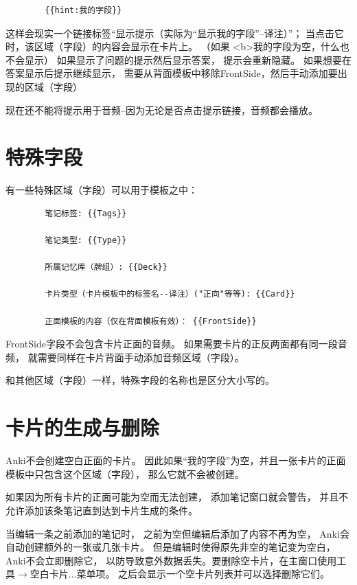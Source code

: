 \documentclass[a4paper]{book}
\begin{document}
	\begin{shaded}\begin{verbatim}
		{{hint:我的字段}}
		\end{verbatim}\end{shaded}
	这样会现实一个链接标签“显示提示（实际为“显示我的字段”--译注）”； 当点击它时，该区域（字段）的内容会显示在卡片上。 （如果
	<b>我的字段为空，什么也不会显示）
	如果显示了问题的提示然后显示答案， 提示会重新隐藏。 如果想要在答案显示后提示继续显示， 需要从背面模板中移除{{FrontSide}}，然后手动添加要出现的区域（字段）
	
	\begin{shaded}
		现在还不能将提示用于音频--因为无论是否点击提示链接，音频都会播放。
	\end{shaded}
	
	\section{特殊字段}\label{specialfields}
	有一些特殊区域（字段）可以用于模板之中：
	\begin{shaded}\begin{verbatim}
		笔记标签: {{Tags}}
		
		笔记类型: {{Type}}
		
		所属记忆库（牌组）: {{Deck}}
		
		卡片类型（卡片模板中的标签名--译注）("正向"等等): {{Card}}
		
		正面模板的内容（仅在背面模板有效）： {{FrontSide}}
		\end{verbatim}\end{shaded}
	FrontSide字段不会包含卡片正面的音频。 如果需要卡片的正反两面都有同一段音频， 就需要同样在卡片背面手动添加音频区域（字段）。
	
	和其他区域（字段）一样，特殊字段的名称也是区分大小写的。
	\section{卡片的生成与删除}
	Anki不会创建空白正面的卡片。 因此如果“我的字段”为空，并且一张卡片的正面模板中只包含这个区域（字段）， 那么它就不会被创建。
	
	如果因为所有卡片的正面可能为空而无法创建， 添加笔记窗口就会警告， 并且不允许添加该条笔记直到达到卡片生成的条件。
	
	当编辑一条之前添加的笔记时， 之前为空但编辑后添加了内容不再为空， Anki会自动创建额外的一张或几张卡片。 但是编辑时使得原先非空的笔记变为空白，Anki不会立即删除它， 以防导致意外数据丢失。要删除空卡片，在主窗口使用工具$\to$空白卡片...菜单项。 之后会显示一个空卡片列表并可以选择删除它们。
	
\end{document}
